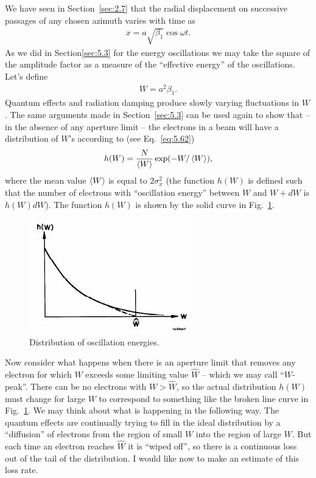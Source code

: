 We have seen in Section~\ref{sec:2.7} that the radial displacement on successive passages of any chosen azimuth varies with time as
\begin{align}
	x = a \sqrt{\beta_1} \cos\omega t.
\end{align}
As we did in Section\ref{sec:5.3} for the energy oscillations we may take the square of the
amplitude factor as a measure of the ``effective energy'' of the oscillations. Let's define
\begin{align}
	W = a^2 \beta_1.
\end{align}
Quantum effects and radiation damping produce slowly varying fluctuations in $W$. The same arguments made in Section~\ref{sec:5.3} can be used again to show that -- in the absence of any aperture limit -- the electrons in a beam will have a distribution of $W$'s according to (see Eq.~\eqref{eq:5.62})
\begin{align}\label{eq:5.120}
	h(W) = \dfrac{N}{\left< W \right>}\exp(-W/\left< W \right>),
\end{align}
where the mean value $\left< W \right>$ is equal to $2\sigma_x^2$ (the function $h(W)$ is defined such
that the number of electrons with ``oscillation energy'' between $W$ and $W + dW$ is $h(W)dW$). The function $h(W)$ is shown by the solid curve in Fig.~\ref{fig:fig47}.
\begin{figure}[!htb]
	\centering
	\includegraphics[width=0.8\linewidth]{./Figuras/fig47.jpeg}
	\caption{Distribution of oscillation energies.}
	\label{fig:fig47}
\end{figure}
Now consider what happens when there is an aperture limit that removes any electron for which $W$ exceeds some limiting value $\hat{W}$ -- which we may call ``$W$-peak''. There can be no electrons with $W > \hat{W}$, so the actual distribution $h(W)$ must change for large $W$ to correspond to something like the broken line curve in Fig.~\ref{fig:fig47}. We may think about what is happening in the following way. The quantum effects are continually trying to fill in the ideal distribution by a ``diffusion'' of electrons from the region of small $W$ into the region of large $W$. But each time an electron reaches $\hat{W}$ it is ``wiped off'', so there is a continuous loss out of the tail of the distribution. I would like now to make an estimate of this loss rate.\\
